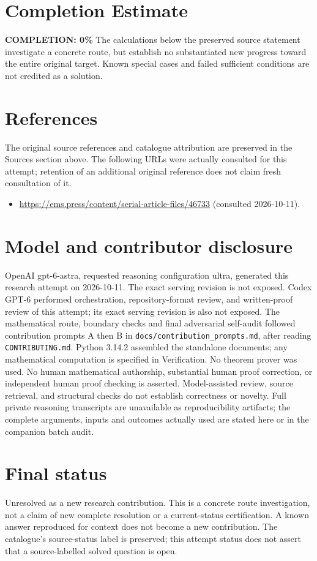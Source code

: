\documentclass[11pt]{article}
\begin{document}
\section{Completion Estimate}
\noindent\textbf{COMPLETION: 0\%}
The calculations below the preserved source statement investigate a concrete route,
but establish no substantiated new progress toward the entire original target.
Known special cases and failed sufficient conditions are not credited as a solution.
\section{References}
The original source references and catalogue attribution are preserved in the
Sources section above. The following URLs were actually consulted for this attempt;
retention of an additional original reference does not claim fresh consultation of it.
\begin{itemize}
\item \url{https://ems.press/content/serial-article-files/46733} (consulted 2026-10-11). 
\end{itemize}
\section{Model and contributor disclosure}
OpenAI gpt-6-astra, requested reasoning configuration ultra, generated this research
attempt on 2026-10-11. The exact serving revision is not exposed. Codex GPT-6
performed orchestration, repository-format review, and written-proof review of this attempt; its exact serving revision
is also not exposed. The mathematical route, boundary checks and final adversarial
self-audit followed contribution prompts A then B in
\texttt{docs/contribution\_prompts.md}, after reading \texttt{CONTRIBUTING.md}.
Python 3.14.2 assembled the standalone documents; any mathematical computation is
specified in Verification. No theorem prover was used. No human mathematical
authorship, substantial human proof correction, or independent human proof checking
is asserted. Model-assisted review, source retrieval, and structural checks do not
establish correctness or novelty. Full private reasoning transcripts are unavailable
as reproducibility artifacts; the complete arguments, inputs and outcomes actually
used are stated here or in the companion batch audit.
\section{Final status}
Unresolved as a new research contribution. This is a concrete route investigation,
not a claim of new complete resolution or a current-status certification. A known
answer reproduced for context does not become a new contribution. The catalogue's
source-status label is preserved; this attempt status does not assert that a
source-labelled solved question is open.
\end{document}

